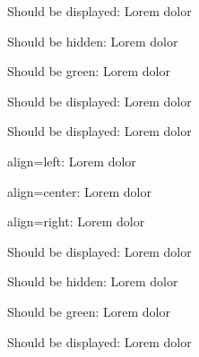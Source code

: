 



\tBeginVerbatim{}
Should be displayed: Lorem dolor
\tEndVerbatim

\tBeginVerbatim{}
Should be hidden: Lorem  dolor
\tEndVerbatim

\tBeginVerbatim{}
Should be green: Lorem  dolor
\tEndVerbatim

\tBeginVerbatim{}
Should be displayed: Lorem  dolor
\tEndVerbatim

\tBeginVerbatim{}
Should be displayed: Lorem  dolor
\tEndVerbatim


\tBeginVerbatim{}
align=left: Lorem  dolor
\tEndVerbatim

\tBeginVerbatim{}
align=center: Lorem  dolor
\tEndVerbatim

\tBeginVerbatim{}
align=right: Lorem  dolor
\tEndVerbatim

\tBeginVerbatim{}
Should be displayed: Lorem dolor
\tEndVerbatim

\tBeginVerbatim{}
Should be hidden: Lorem  dolor
\tEndVerbatim

\tBeginVerbatim{}
Should be green: Lorem  dolor
\tEndVerbatim

\tBeginVerbatim{}
Should be displayed: Lorem  dolor
\tEndVerbatim

\tAll

\bye
